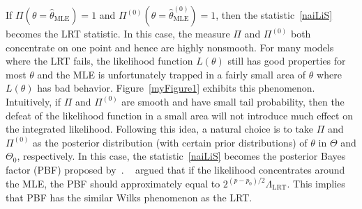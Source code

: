 \documentclass[11pt]{article}
\theoremstyle{plain}
\theoremstyle{definition}
\theoremstyle{remark}
\begin{document}
If $\Pi(\theta=\hat{\theta}_{\text{MLE}})=1$ and $\Pi^{(0)}(\theta=\hat{\theta}^{(0)}_{\text{MLE}})=1$, then the statistic~\eqref{naiLiS} becomes the LRT statistic.
In this case, the measure $\Pi$ and $\Pi^{(0)}$ both concentrate on one point and hence are highly nonsmooth.
For many models where the LRT fails, the likelihood function $L(\theta)$ still has good properties for most $\theta$ and  the MLE is unfortunately trapped in a fairly small area of $\theta$ where $L(\theta)$ has bad behavior.
Figure~\ref{myFigure1} exhibits this phenomenon.
Intuitively,
if $\Pi$ and $\Pi^{(0)}$ are smooth and have small tail probability,
then the defeat of the likelihood function in a small area will not introduce much effect on the integrated likelihood.
Following this idea, a natural choice is to take $\Pi$ and $\Pi^{(0)}$ as the posterior distribution (with certain prior distributions) of $\theta$ in $\Theta$ and $\Theta_0$, respectively.
In this case, the statistic~\eqref{naiLiS} becomes the posterior Bayes factor (PBF) proposed by~\cite{Aitkin1991Posterior}.
~\cite{Aitkin1991Posterior} argued that if the likelihood concentrates around the MLE, the PBF should approximately equal to $2^{(p-p_0)/2}\Lambda_{\text{LRT}}$.
This implies that PBF has the similar Wilks phenomenon as the LRT.
\end{document}
